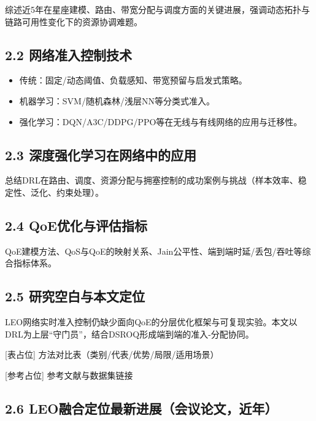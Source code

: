 综述近5年在星座建模、路由、带宽分配与调度方面的关键进展，强调动态拓扑与链路可用性变化下的资源协调难题。

\subsection{2.2
网络准入控制技术}\label{ux7f51ux7edcux51c6ux5165ux63a7ux5236ux6280ux672f}

\begin{itemize}
\tightlist
\item
  传统：固定/动态阈值、负载感知、带宽预留与启发式策略。
\item
  机器学习：SVM/随机森林/浅层NN等分类式准入。
\item
  强化学习：DQN/A3C/DDPG/PPO等在无线与有线网络的应用与迁移性。
\end{itemize}

\subsection{2.3
深度强化学习在网络中的应用}\label{ux6df1ux5ea6ux5f3aux5316ux5b66ux4e60ux5728ux7f51ux7edcux4e2dux7684ux5e94ux7528}

总结DRL在路由、调度、资源分配与拥塞控制的成功案例与挑战（样本效率、稳定性、泛化、约束处理）。

\subsection{2.4
QoE优化与评估指标}\label{qoeux4f18ux5316ux4e0eux8bc4ux4f30ux6307ux6807}

QoE建模方法、QoS与QoE的映射关系、Jain公平性、端到端时延/丢包/吞吐等综合指标体系。

\subsection{2.5
研究空白与本文定位}\label{ux7814ux7a76ux7a7aux767dux4e0eux672cux6587ux5b9aux4f4d}

LEO网络实时准入控制仍缺少面向QoE的分层优化框架与可复现实验。本文以DRL为上层``守门员''，结合DSROQ形成端到端的准入-分配协同。

{[}表占位{]} 方法对比表（类别/代表/优势/局限/适用场景）

{[}参考占位{]} 参考文献与数据集链接

\subsection{2.6
LEO融合定位最新进展（会议论文，近年）}\label{leoux878dux5408ux5b9aux4f4dux6700ux65b0ux8fdbux5c55ux4f1aux8baeux8bbaux6587ux8fd1ux5e74}

